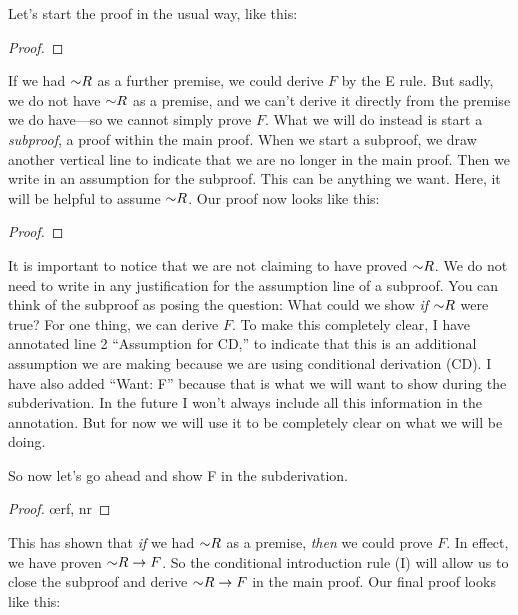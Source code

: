 Let's start the proof in the usual way, like this:

\begin{proof}
	 
\end{proof}

If we had $\mathord{\sim} R$ as a further premise, we could derive $F$ by the {\eor}E rule. But sadly, we do not have $\mathord{\sim} R$ as a premise, and we can't derive it directly from the premise we do have---so we cannot simply prove $F$. What we will do instead is start a \emph{subproof}, a proof within the main proof. When we start a subproof, we draw another vertical line to indicate that we are no longer in the main proof. Then we write in an assumption for the subproof. This can be anything we want. Here, it will be helpful to assume $\mathord{\sim} R$. Our proof now looks like this:

\begin{proof}
	\open
	\close
\end{proof}

It is important to notice that we are not claiming to have proved $\mathord{\sim} R$. We do not need to write in any justification for the assumption line of a subproof. You can think of the subproof as posing the question: What could we show \emph{if} $\mathord{\sim} R$ were true? For one thing, we can derive $F$. To make this completely clear, I have annotated line 2 ``Assumption for CD,'' to indicate that this is an additional assumption we are making because we are using conditional derivation (CD). I have also added ``Want: F'' because that is what we will want to show during the subderivation. In the future I won't always include all this information in the annotation. But for now we will use it to be completely clear on what we will be doing.

So now let's go ahead and show F in the subderivation. 

\begin{proof}
	\open
		\oe{rf, nr}
	\close
\end{proof}

This has shown that \emph{if} we had $\mathord{\sim} R$ as a premise, \emph{then} we could prove $F$. In effect, we have proven $\mathord{\sim} R \rightarrow F$. So the conditional introduction rule ({\eif}I) will allow us to close the subproof and derive $\mathord{\sim} R \rightarrow F$ in the main proof. Our final proof looks like this:

